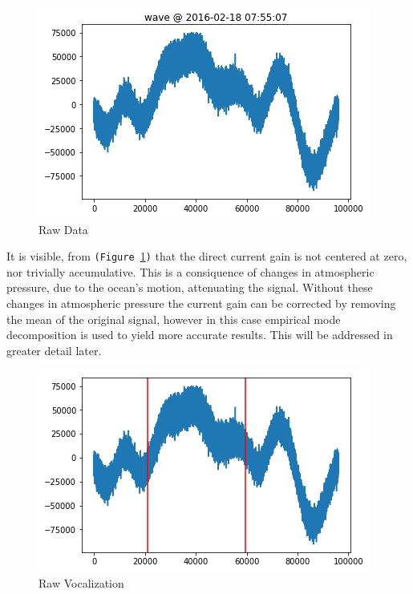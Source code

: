 \documentclass{article}
\begin{document}
\begin{multicols}{2}
\begin{figure}[H]
  \includegraphics[width=\columnwidth]{./rawwave.png}
  \caption{Raw Data}
  \label{fig:rawwav}

\end{figure}

It is visible, from \texttt{(Figure~\ref{fig:rawwav})} that the direct current gain is not centered at zero, nor trivially accumulative. This is a consiquence of changes in atmospheric pressure, due to the ocean's motion, attenuating the signal. Without these changes in atmospheric pressure the current gain can be corrected by removing the mean of the original signal, however in this case empirical mode decomposition is used to yield more accurate results. This will be addressed in greater detail later.

\begin{figure}[H]
  \centering

  \includegraphics[width=\columnwidth]{./rawvocal.png}
  \caption{Raw Vocalization}
  \label{fig:rawvoc}


\end{figure}
\end{multicols}
\end{document}
